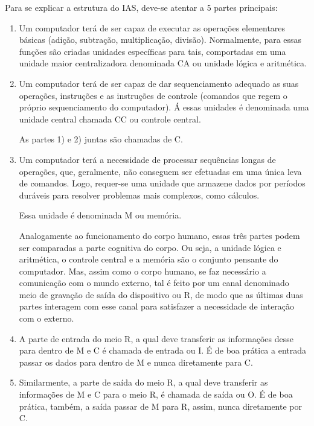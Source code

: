 \documentclass{article}
\begin{document}
Para se explicar a estrutura do IAS, deve-se atentar a 5 partes principais:

\begin{enumerate}
    \item Um computador terá de ser capaz de executar as operações elementares
        básicas (adição, subtração, multiplicação, divisão). Normalmente, para
        essas funções são criadas unidades específicas para tais, comportadas em
        uma unidade maior centralizadora denominada CA ou unidade lógica e
        aritmética.

    \item Um computador terá de ser capaz de dar sequenciamento adequado as suas
        operações, instruções e as instruções de controle (comandos que regem o
        próprio sequenciamento do computador). Á essas unidades é denominada uma
        unidade central chamada CC ou controle central.

        As partes 1) e 2) juntas são chamadas de C. 

    \item Um computador terá a necessidade de processar sequências longas de
        operações, que, geralmente, não conseguem ser efetuadas em uma única
        leva de comandos. Logo, requer-se uma unidade que armazene dados por
        períodos duráveis para resolver problemas mais complexos, como cálculos.

        Essa unidade é denominada M ou memória.

        Analogamente ao funcionamento do corpo humano, essas três partes podem
        ser comparadas a parte cognitiva do corpo. Ou seja, a unidade lógica e
        aritmética, o controle central e a memória são o conjunto pensante do
        computador. Mas, assim como o corpo humano, se faz necessário a
        comunicação com o mundo externo, tal é feito por um canal denominado
        meio de gravação de saída do dispositivo ou R, de modo que as últimas
        duas partes interagem com esse canal para satisfazer a necessidade de
        interação com o externo. 

    \item A parte de entrada do meio R, a qual deve transferir as informações
        desse para dentro de M e C é chamada de entrada ou I. É de boa prática a
        entrada passar os dados para dentro de M e nunca diretamente para C. 

    \item Similarmente, a parte de saída do meio R, a qual deve transferir as
        informações de M e C para o meio R, é chamada de saída ou O. É de boa
        prática, também, a saída passar de M para R, assim, nunca diretamente
        por C. 
\end{enumerate}
\end{document}
